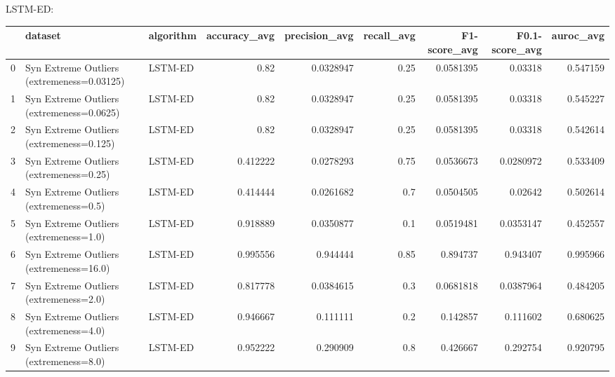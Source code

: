 LSTM-ED:

\begin{tabular}{rllrrrrrr}
\hline
    & dataset                                    & algorithm   &   accuracy\_avg &   precision\_avg &   recall\_avg &   F1-score\_avg &   F0.1-score\_avg &   auroc\_avg \\
\hline
  0 & Syn Extreme Outliers (extremeness=0.03125) & LSTM-ED     &       0.82     &       0.0328947 &         0.25 &      0.0581395 &        0.03318   &    0.547159 \\
  1 & Syn Extreme Outliers (extremeness=0.0625)  & LSTM-ED     &       0.82     &       0.0328947 &         0.25 &      0.0581395 &        0.03318   &    0.545227 \\
  2 & Syn Extreme Outliers (extremeness=0.125)   & LSTM-ED     &       0.82     &       0.0328947 &         0.25 &      0.0581395 &        0.03318   &    0.542614 \\
  3 & Syn Extreme Outliers (extremeness=0.25)    & LSTM-ED     &       0.412222 &       0.0278293 &         0.75 &      0.0536673 &        0.0280972 &    0.533409 \\
  4 & Syn Extreme Outliers (extremeness=0.5)     & LSTM-ED     &       0.414444 &       0.0261682 &         0.7  &      0.0504505 &        0.02642   &    0.502614 \\
  5 & Syn Extreme Outliers (extremeness=1.0)     & LSTM-ED     &       0.918889 &       0.0350877 &         0.1  &      0.0519481 &        0.0353147 &    0.452557 \\
  6 & Syn Extreme Outliers (extremeness=16.0)    & LSTM-ED     &       0.995556 &       0.944444  &         0.85 &      0.894737  &        0.943407  &    0.995966 \\
  7 & Syn Extreme Outliers (extremeness=2.0)     & LSTM-ED     &       0.817778 &       0.0384615 &         0.3  &      0.0681818 &        0.0387964 &    0.484205 \\
  8 & Syn Extreme Outliers (extremeness=4.0)     & LSTM-ED     &       0.946667 &       0.111111  &         0.2  &      0.142857  &        0.111602  &    0.680625 \\
  9 & Syn Extreme Outliers (extremeness=8.0)     & LSTM-ED     &       0.952222 &       0.290909  &         0.8  &      0.426667  &        0.292754  &    0.920795 \\
\hline
\end{tabular}

